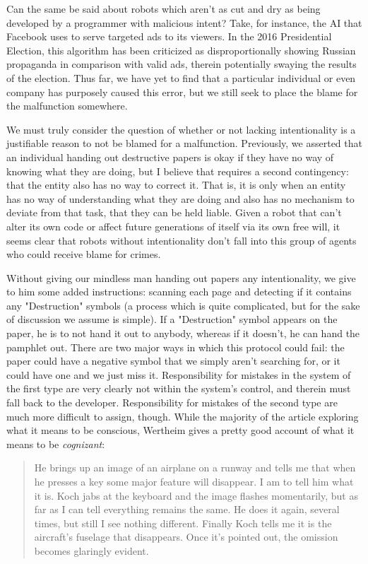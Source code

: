\documentclass[12]{article}
\begin{document}
		Can the same be said about robots which aren't as cut and dry as being developed by a programmer with malicious intent? Take, for instance, the AI that Facebook uses to serve targeted ads to its viewers. In the 2016 Presidential Election, this algorithm has been criticized as disproportionally showing Russian propaganda\cite{facebook_russia} in comparison with valid ads, therein potentially swaying the results of the election. Thus far, we have yet to find that a particular individual or even company has purposely caused this error, but we still seek to place the blame for the malfunction somewhere.
	
		We must truly consider the question of whether or not lacking intentionality is a justifiable reason to not be blamed for a malfunction. Previously, we asserted that an individual handing out destructive papers is okay if they have no way of knowing what they are doing, but I believe that requires a second contingency: that the entity also has no way to correct it. That is, it is only when an entity has no way of understanding what they are doing and also has no mechanism to deviate from that task, that they can be held liable. Given a robot that can't alter its own code or affect future generations of itself via its own free will, it seems clear that robots without intentionality don't fall into this group of agents who could receive blame for crimes.
	
		Without giving our mindless man handing out papers any intentionality, we give to him some added instructions: scanning each page and detecting if it contains any "Destruction" symbols (a process which is quite complicated, but for the sake of discussion we assume is simple). If a "Destruction" symbol appears on the paper, he is to not hand it out to anybody, whereas if it doesn't, he can hand the pamphlet out. There are two major ways in which this protocol could fail: the paper could have a negative symbol that we simply aren't searching for, or it could have one and we just miss it. Responsibility for mistakes in the system of the first type are very clearly not within the system's control, and therein must fall back to the developer. Responsibility for mistakes of the second type are much more difficult to assign, though. While the majority of the article exploring what it means to be conscious, Wertheim gives a pretty good account of what it means to be \textit{cognizant}\cite{zombie_within}:

		\begin{quote}
			He brings up an image of an airplane on a runway and tells me that when he presses a key some major feature will disappear. I am to tell him what it is. Koch jabs at the keyboard and the image flashes momentarily, but as far as I can tell everything remains the same. He does it again, several times, but still I see nothing different. Finally Koch tells me it is the aircraft’s fuselage that disappears. Once it’s pointed out, the omission becomes glaringly evident.
		\end{quote}
		
\end{document}
